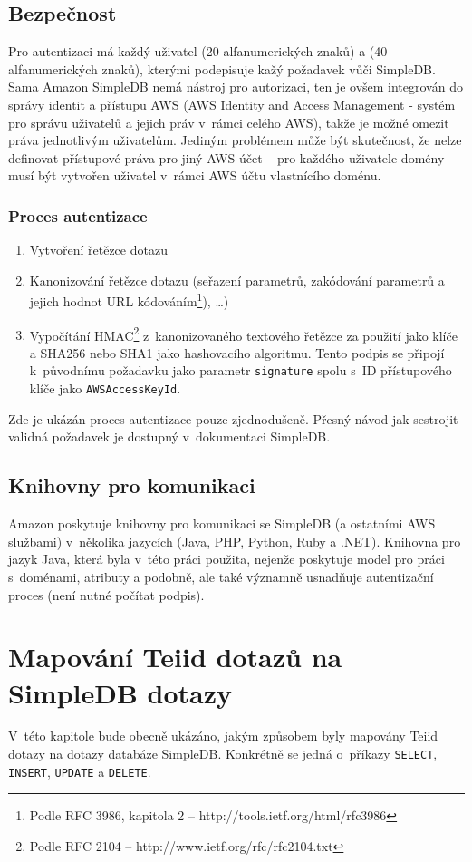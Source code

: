 \documentclass[oneside,12pt,final]{fithesis2}
\begin{document}
\section{Bezpečnost}
Pro autentizaci má každý uživatel  (20 alfanumerických znaků) a  (40 alfanumerických znaků), kterými podepisuje kažý požadavek vůči SimpleDB. Sama Amazon SimpleDB nemá nástroj pro autorizaci, ten je ovšem integrován do správy identit a přístupu AWS (AWS Identity and Access Management - systém pro správu uživatelů a jejich práv v~rámci celého AWS), takže je možné omezit práva jednotlivým uživatelům. Jediným problémem může být skutečnost, že nelze definovat přístupové práva pro jiný AWS účet -- pro každého uživatele domény musí být vytvořen uživatel v~rámci AWS účtu vlastnícího doménu.

\subsection{Proces autentizace}
\begin{enumerate}
 \item Vytvoření řetězce dotazu
 \item Kanonizování řetězce dotazu (seřazení parametrů, zakódování parametrů a jejich hodnot URL kódováním\footnote{Podle RFC 3986, kapitola 2 -- http://tools.ietf.org/html/rfc3986}), \dots)
 \item Vypočítání HMAC\footnote{Podle RFC 2104 -- http://www.ietf.org/rfc/rfc2104.txt} z~kanonizovaného textového řetězce za použití  jako klíče a SHA256 nebo SHA1 jako hashovacího algoritmu. Tento podpis se připojí k~původnímu požadavku jako parametr \verb<signature< spolu s~ID přístupového klíče jako \verb<AWSAccessKeyId<.
\end{enumerate}
Zde je ukázán proces autentizace pouze zjednodušeně. Přesný návod jak sestrojit validná požadavek je dostupný v~dokumentaci SimpleDB.

\section{Knihovny pro komunikaci}
Amazon poskytuje knihovny pro komunikaci se SimpleDB (a ostatními AWS službami) v~několika jazycích (Java, PHP, Python, Ruby a .NET). 
Knihovna pro jazyk Java, která byla v~této práci použita, nejenže poskytuje model pro práci s~doménami, atributy a podobně, ale také významně usnadňuje autentizační proces (není nutné  počítat podpis).
\chapter{Mapování Teiid dotazů na SimpleDB dotazy}
V~této kapitole bude obecně ukázáno, jakým způsobem byly mapovány Teiid dotazy na dotazy databáze SimpleDB. Konkrétně se jedná o~příkazy \verb<SELECT<, \verb<INSERT<, \verb<UPDATE< a \verb<DELETE<.
\end{document}
